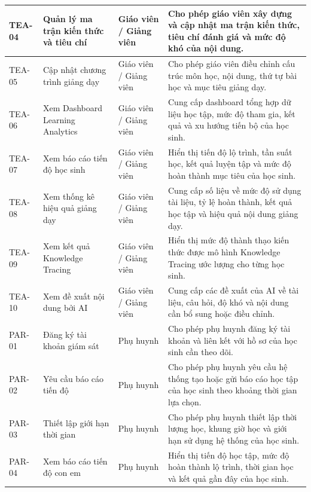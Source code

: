 \begin{longtable}{|p{}|p{}|p{}|p{}|}
TEA-04 &
Quản lý ma trận kiến thức và tiêu chí &
Giáo viên / Giảng viên &
Cho phép giáo viên xây dựng và cập nhật ma trận kiến thức, tiêu chí đánh giá và mức độ khó của nội dung. \\
\hline

TEA-05 &
Cập nhật chương trình giảng dạy &
Giáo viên / Giảng viên &
Cho phép giáo viên điều chỉnh cấu trúc môn học, nội dung, thứ tự bài học và mục tiêu giảng dạy. \\
\hline

TEA-06 &
Xem Dashboard Learning Analytics &
Giáo viên / Giảng viên &
Cung cấp dashboard tổng hợp dữ liệu học tập, mức độ tham gia, kết quả và xu hướng tiến bộ của học sinh. \\
\hline

TEA-07 &
Xem báo cáo tiến độ học sinh &
Giáo viên / Giảng viên &
Hiển thị tiến độ lộ trình, tần suất học, kết quả luyện tập và mức độ hoàn thành mục tiêu của học sinh. \\
\hline

TEA-08 &
Xem thống kê hiệu quả giảng dạy &
Giáo viên / Giảng viên &
Cung cấp số liệu về mức độ sử dụng tài liệu, tỷ lệ hoàn thành, kết quả học tập và hiệu quả nội dung giảng dạy. \\
\hline

TEA-09 &
Xem kết quả Knowledge Tracing &
Giáo viên / Giảng viên &
Hiển thị mức độ thành thạo kiến thức được mô hình Knowledge Tracing ước lượng cho từng học sinh. \\
\hline

TEA-10 &
Xem đề xuất nội dung bởi AI &
Giáo viên / Giảng viên &
Cung cấp các đề xuất của AI về tài liệu, câu hỏi, độ khó và nội dung cần bổ sung hoặc điều chỉnh. \\
\hline

PAR-01 &
Đăng ký tài khoản giám sát &
Phụ huynh &
Cho phép phụ huynh đăng ký tài khoản và liên kết với hồ sơ của học sinh cần theo dõi. \\
\hline

PAR-02 &
Yêu cầu báo cáo tiến độ &
Phụ huynh &
Cho phép phụ huynh yêu cầu hệ thống tạo hoặc gửi báo cáo học tập của học sinh theo khoảng thời gian lựa chọn. \\
\hline

PAR-03 &
Thiết lập giới hạn thời gian &
Phụ huynh &
Cho phép phụ huynh thiết lập thời lượng học, khung giờ học và giới hạn sử dụng hệ thống của học sinh. \\
\hline

PAR-04 &
Xem báo cáo tiến độ con em &
Phụ huynh &
Hiển thị tiến độ học tập, mức độ hoàn thành lộ trình, thời gian học và kết quả gần đây của học sinh. \\
\hline


\end{longtable}
